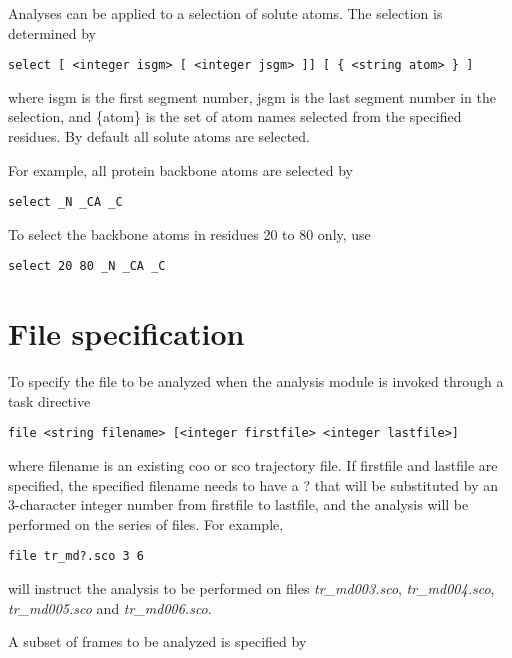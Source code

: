 Analyses can be applied to a selection of solute atoms. The selection
is determined by

\begin{verbatim}
select [ <integer isgm> [ <integer jsgm> ]] [ { <string atom> } ]
\end{verbatim}

where {\rm isgm} is the first segment number, {\rm jsgm} is the last 
segment number in the selection, and {\rm \{atom\}} is the set of atom
names selected from the specified residues. By default all solute
atoms are selected.
\par
For example, all protein backbone atoms are selected by

\begin{verbatim}
select _N _CA _C
\end{verbatim}

To select the backbone atoms in residues 20 to 80 only, use

\begin{verbatim}
select 20 80 _N _CA _C
\end{verbatim}

\section{File specification}

To specify the file to be analyzed when the analysis module is
invoked through a task directive

\begin{verbatim}
file <string filename> [<integer firstfile> <integer lastfile>] 
\end{verbatim}

where {\rm filename} is an existing {\rm coo} or {\rm sco} trajectory file.
If {\rm firstfile} and {\rm lastfile} are specified, the specified
{\rm filename} needs to have a {\rm ?} that will be substituted by
an 3-character integer number from {\rm firstfile} to {\rm lastfile},
and the analysis will be performed on the series of files.
For example,

\begin{verbatim}
file tr_md?.sco 3 6
\end{verbatim}

will instruct the analysis to be performed on files {\it tr\_md003.sco},
{\it tr\_md004.sco}, {\it tr\_md005.sco} and {\it tr\_md006.sco}.

\par
A subset of frames to be analyzed is specified by

